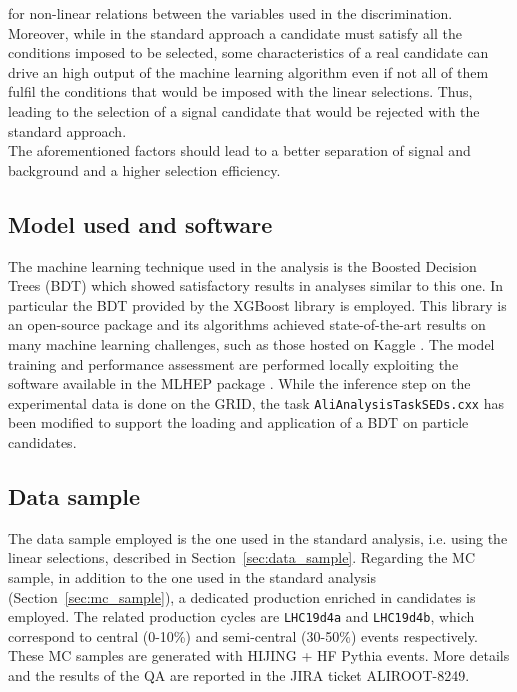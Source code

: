 for non-linear relations between the variables used in the discrimination. Moreover, while in the standard approach 
a candidate must satisfy all the conditions imposed to be selected, some characteristics of a real \Dsubs{} candidate can drive an 
high output of the machine learning algorithm even if not all of them fulfil the conditions that would be imposed with the linear selections. 
Thus, leading to the selection of a signal candidate that would be rejected with the standard approach. \\
The aforementioned factors should lead to a better separation of signal and background and a higher selection efficiency.

\subsection{Model used and software}
The machine learning technique used in the analysis is the Boosted Decision Trees (BDT) which showed satisfactory results in analyses similar to this one.
In particular the BDT provided by the XGBoost library \cite{DBLP:journals/corr/ChenG16} is employed. 
This library is an open-source package and its algorithms achieved state-of-the-art results on many machine learning challenges, such as those hosted on Kaggle \cite{Kaggle}.
The model training and performance assessment are performed locally exploiting the software available in the MLHEP package \cite{MLHEP}. 
While the inference step on the experimental data is done on the GRID, the \Dsubs task \texttt{AliAnalysisTaskSEDs.cxx} has been modified to support the loading and application of 
a BDT on particle candidates.

\subsection{Data sample}
The data sample employed is the one used in the standard analysis, i.e. using the linear selections, described in Section~\ref{sec:data_sample}.
Regarding the MC sample, in addition to the one used in the standard analysis (Section~\ref{sec:mc_sample}), a dedicated production enriched in 
\Dsubs candidates is employed. The related production cycles are \texttt{LHC19d4a} and \texttt{LHC19d4b}, which correspond to central (0-10\%) 
and semi-central (30-50\%) events respectively. These MC samples are generated with HIJING + HF Pythia events. More details and the results of
the QA are reported in the JIRA ticket ALIROOT-8249. \\ 

